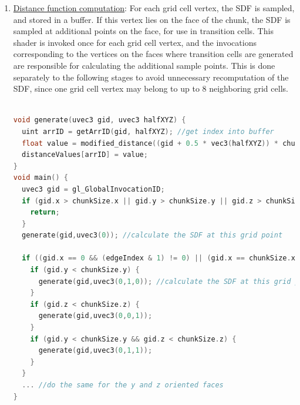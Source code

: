 \documentclass[11pt]{article}
\begin{document}
\begin{enumerate}
\item \underline{Distance function computation}: For each grid cell vertex, the SDF is sampled, and stored in a buffer. If this vertex lies on the face of the chunk, the SDF is sampled at additional points on the face, for use in transition cells. This shader is invoked once for each grid cell vertex, and the invocations corresponding to the vertices on the faces where transition cells are generated are responsible for calculating the additional sample points. This is done separately to the following stages to avoid unnecessary recomputation of the SDF, since one grid cell vertex may belong to up to 8 neighboring grid cells.

\begin{lstlisting}[language=C++,label={tv_generate},caption={Code snippet that samples the SDF at the grid point, as well as at the points needed for any transition cells on the -X and +X facing faces. The \texttt{generate} function is responsible for sampling the SDF and storing the value in a buffer, and takes 2 parameters: the first is the actual position of the grid cell vertex, and the second is an offset parameter, for generating sample values halfway beetween grid vertices. For example, a value of \texttt{uvec3(0,1,0)} corresponds to a point that is offset from the position in the first argument by half a grid cell in the Y direction.}]

void generate(uvec3 gid, uvec3 halfXYZ) {
  uint arrID = getArrID(gid, halfXYZ); //get index into buffer
  float value = modified_distance((gid + 0.5 * vec3(halfXYZ)) * chunkStride + chunkPosition); //compute the SDF
  distanceValues[arrID] = value;
}
void main() {
  uvec3 gid = gl_GlobalInvocationID;
  if (gid.x > chunkSize.x || gid.y > chunkSize.y || gid.z > chunkSize.z) {
    return;
  }
  generate(gid,uvec3(0)); //calculate the SDF at this grid point

  if ((gid.x == 0 && (edgeIndex & 1) != 0) || (gid.x == chunkSize.x && (edgeIndex & 2) != 0)) {
    if (gid.y < chunkSize.y) {
      generate(gid,uvec3(0,1,0)); //calculate the SDF at this grid point, offset by half the grid width in the y direction
    }
    if (gid.z < chunkSize.z) {
      generate(gid,uvec3(0,0,1));
    }
    if (gid.y < chunkSize.y && gid.z < chunkSize.z) {
      generate(gid,uvec3(0,1,1));
    }
  }
  ... //do the same for the y and z oriented faces  
}
\end{lstlisting}


\end{enumerate}
\end{document}
